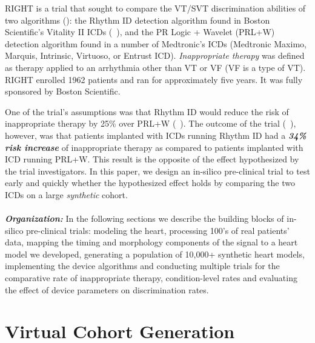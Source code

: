 RIGHT is a trial that sought to compare the VT/SVT discrimination abilities of two algorithms (\cite{GoldABBTB11_RIGHTresults}): 
the Rhythm ID detection algorithm found in Boston Scientific's Vitality II ICDs (~\cite{compass}),
and the PR Logic + Wavelet (PRL+W) detection algorithm found in a number of Medtronic's ICDs (Medtronic Maximo,
Marquis, Intrinsic, Virtuoso, or Entrust ICD).
\emph{Inappropriate therapy} was defined as therapy applied to an arrhythmia other than VT or VF (VF is a type of VT).
RIGHT enrolled 1962 patients and ran for approximately five years.
It was fully sponsored by Boston Scientific. 

One of the trial's assumptions was that Rhythm ID would reduce the risk of inappropriate therapy by 25\% over PRL+W (~\cite{Berger06_RIGHT}).
The outcome of the trial (~\cite{GoldABBTB11_RIGHTresults}), however, was that patients implanted with ICDs running Rhythm ID had a \emph{\textbf{34\% risk increase}} of inappropriate therapy as compared to patients implanted with ICD running PRL+W. 
This result  is the opposite of the effect hypothesized by the trial investigators. 
In this paper, we design an in-silico pre-clinical trial to test early and quickly whether the hypothesized effect holds by comparing the two ICDs on a large \emph{synthetic} cohort.\\\\
\textbf{\emph{Organization:}} In the following sections we describe the building blocks of in-silico pre-clinical trials: modeling the heart, processing 100's of real patients' data, mapping the timing and morphology components of the signal to a heart model we developed, generating a population of 10,000+ synthetic heart models, implementing the device algorithms and conducting multiple trials for the comparative rate of inappropriate therapy, condition-level rates and evaluating the effect of device parameters on discrimination rates.

 \section{Virtual Cohort Generation}
 \label{sec:heart modeling}

